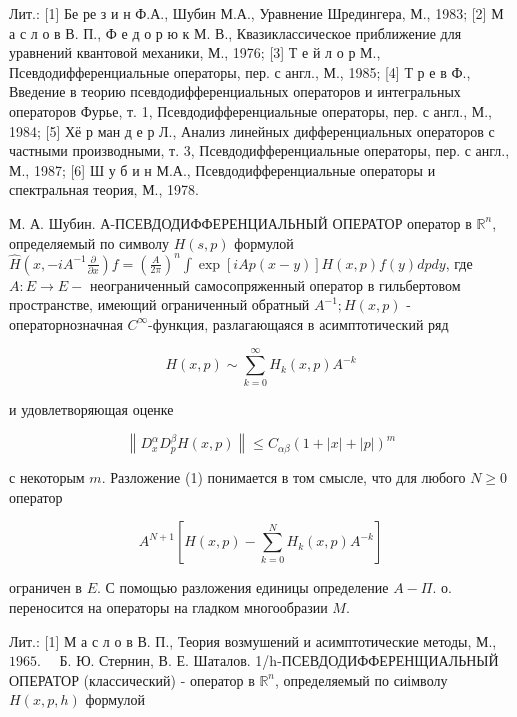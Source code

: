 \documentclass[10pt]{article}
\begin{document}
Лит.: [1] Бе ре з и н Ф.А., Шубин М.А., Уравнение Шредингера, М., 1983; [2] М а с л о в В. П., Ф е д о р ю к М. В., Квазиклассическое приближение для уравнений квантовой механики, М., 1976; [3] Т е й л о р М., Псевдодифференциальные операторы, пер. с англ., М., 1985; [4] Т р е в Ф., Введение в теорию псевдодифференциальных операторов и интегральных операторов Фурье, т. 1, Псевдодифференциальные операторы, пер. с англ., М., 1984; [5] Хё р ман д е р Л., Анализ линейных дифференциальных операторов с частными производными, т. 3, Псевдодифференциальные операторы, пер. с англ., М., 1987; [6] Ш у б и н М.А., Псевдодифференциальные операторы и спектральная теория, М., 1978.



М. А. Шубин. А-ПСЕВДОДИФФЕРЕНЦИАЛЬНЫЙ ОПЕРАТОР оператор в $\mathbb{R}^{n}$, определяемый по символу $H(s, p)$ формулой $\hat{H}\left(x,-i A^{-1} \frac{\partial}{\partial x}\right) f=\left(\frac{A}{2 \pi}\right)^{n} \int \exp [i A p(x-y)] H(x, p) f(y) d p d y$, где $A: E \rightarrow E-$ неограниченный самосопряженный оператор в гильбертовом пространстве, имеющий ограниченный обратный $A^{-1} ; H(x, p)$ - операторнозначная $C^{\infty}$-функция, разлагающаяся в асимптотический ряд



\[

H(x, p) \sim \sum_{k=0}^{\infty} H_{k}(x, p) A^{-k}

\]



и удовлетворяющая оценке



\[

\left\|D_{x}^{\alpha} D_{p}^{\beta} H(x, p)\right\| \leqslant C_{\alpha \beta}(1+|x|+|p|)^{m}

\]



с некоторым $m$. Разложение (1) понимается в том смысле, что для любого $N \geqslant 0$ оператор



\[

A^{N+1}\left[H(x, p)-\sum_{k=0}^{N} H_{k}(x, p) A^{-k}\right]

\]



ограничен в $E$. С помощью разложения единицы определение $A-\Pi$. о. переносится на операторы на гладком многообразии $M$.



Лит.: [1] М а с л о в В. П., Теория возмушений и асимптотические методы, М., $1965 . \quad$ Б. Ю. Стернин, В. Е. Шаталов. 1/h-ПСЕВДОДИФФЕРЕНЩИАЛЬНЫЙ ОПЕРАТОР (классический) - оператор в $\mathbb{R}^{n}$, определяемый по сиімволу $H(x, p, h)$ формулой
\end{document}
